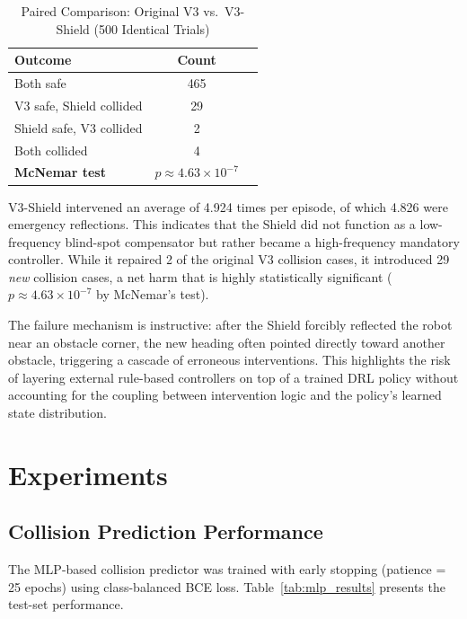\documentclass[conference]{IEEEtran}
\begin{document}
\begin{table}[H]
\centering
\caption{Paired Comparison: Original V3 vs.\ V3-Shield (500 Identical Trials)}
\label{tab:v3_shield_paired}
\begin{tabular}{@{}lcc@{}}
\toprule
\textbf{Outcome} & \textbf{Count} \\
\midrule
Both safe               & 465 \\
V3 safe, Shield collided & 29 \\
Shield safe, V3 collided & 2 \\
Both collided           & 4 \\
\midrule
\textbf{McNemar test}   & $p \approx 4.63 \times 10^{-7}$ \\
\bottomrule
\end{tabular}
\end{table}

V3-Shield intervened an average of 4.924 times per episode, of which 4.826 were emergency reflections. This indicates that the Shield did not function as a low-frequency blind-spot compensator but rather became a high-frequency mandatory controller. While it repaired 2 of the original V3 collision cases, it introduced 29 \emph{new} collision cases, a net harm that is highly statistically significant ($p \approx 4.63 \times 10^{-7}$ by McNemar's test).

The failure mechanism is instructive: after the Shield forcibly reflected the robot near an obstacle corner, the new heading often pointed directly toward another obstacle, triggering a cascade of erroneous interventions. This highlights the risk of layering external rule-based controllers on top of a trained DRL policy without accounting for the coupling between intervention logic and the policy's learned state distribution.

\section{Experiments}

\subsection{Collision Prediction Performance}

The MLP-based collision predictor was trained with early stopping (patience = 25 epochs) using class-balanced BCE loss. Table~\ref{tab:mlp_results} presents the test-set performance.
\end{document}
